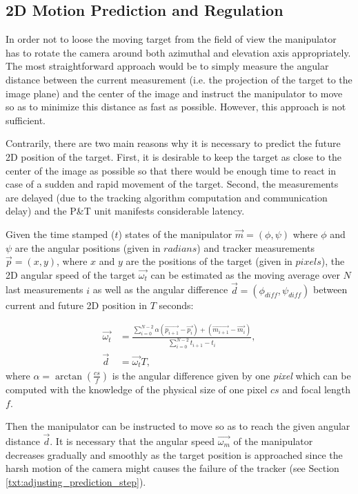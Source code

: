 \subsection{2D Motion Prediction and Regulation} \label{txt:2d_motion_prediction_and_regulation}

In order not to loose the moving target from the field of view the manipulator has to rotate the camera around both azimuthal and elevation axis appropriately. The most straightforward approach would be to simply measure the angular distance between the current measurement (i.e. the projection of the target to the image plane) and the center of the image and instruct the manipulator to move so as to minimize this distance as fast as possible. However, this approach is not sufficient. 

Contrarily, there are two main reasons why it is necessary to predict the future 2D position of the target. First, it is desirable to keep the target as close to the center of the image as possible so that there would be enough time to react in case of a sudden and rapid movement of the target. Second, the measurements are delayed (due to the tracking algorithm computation and communication delay) and the P\&T unit manifests considerable latency.

Given the time stamped ($t$) states of the manipulator $\vec{m} = (\phi, \psi)$ where $\phi$ and $\psi$ are the angular positions (given in $radians$) and tracker measurements $\vec{p} = (x, y)$, where $x$ and $y$ are the positions of the target (given in $pixels$), the 2D angular speed of the target $\vec{\omega_{t}}$ can be estimated as the moving average over $N$ last measurements $i$ as well as the angular difference $\vec{d} = (\phi_{diff}, \psi_{diff})$ between current and future 2D position in $T$ seconds:

\begin{align}
	\vec{\omega_{t}} &= \frac{\sum_{i=0}^{N-2}{\alpha(\vec{p_{i+1}} - \vec{p_{i}}) + (\vec{m_{i+1}} - \vec{m_{i}})}}{\sum_{i=0}^{N-2}{t_{i+1} - t_{i}}},\\
	\vec{d} &= \vec{\omega_{t}}T,
\end{align}
where $\alpha = \arctan{(\frac{cs}{f})}$ is the angular difference given by one \textit{pixel} which can be computed with the knowledge of the physical size of one pixel $cs$ and focal length $f$.

Then the manipulator can be instructed to move so as to reach the given angular distance $\vec{d}$. It is necessary that the angular speed $\vec{\omega_{m}}$ of the manipulator decreases gradually and smoothly as the target position is approached since the harsh motion of the camera might causes the failure of the tracker (see Section \ref{txt:adjusting_prediction_step}).

